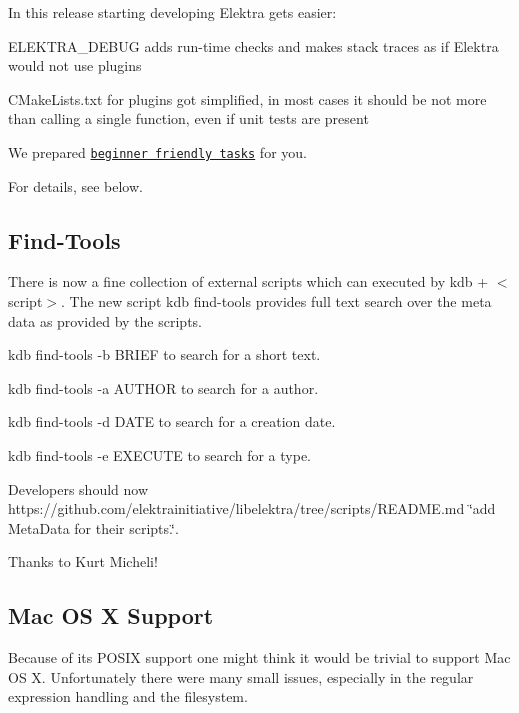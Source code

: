 In this release starting developing Elektra gets easier\+:


\begin{DoxyItemize}
\item E\+L\+E\+K\+T\+R\+A\+\_\+\+D\+E\+B\+U\+G adds run-\/time checks and makes stack traces as if Elektra would not use plugins
\item C\+Make\+Lists.\+txt for plugins got simplified, in most cases it should be not more than calling a single function, even if unit tests are present
\item We prepared \href{https://github.com/ElektraInitiative/libelektra/issues?q=is%3Aissue+is%3Aopen+label%3A%22beginner+friendly%22}{\tt beginner friendly tasks} for you.
\end{DoxyItemize}

For details, see below.

\subsection*{Find-\/\+Tools}

There is now a fine collection of external scripts which can executed by {\ttfamily kdb + $<$script$>$}. The new script {\ttfamily kdb find-\/tools} provides full text search over the meta data as provided by the scripts.


\begin{DoxyItemize}
\item {\ttfamily kdb find-\/tools -\/b B\+R\+I\+E\+F} to search for a short text.
\item {\ttfamily kdb find-\/tools -\/a A\+U\+T\+H\+O\+R} to search for a author.
\item {\ttfamily kdb find-\/tools -\/d D\+A\+T\+E} to search for a creation date.
\item {\ttfamily kdb find-\/tools -\/e E\+X\+E\+C\+U\+T\+E} to search for a type.
\end{DoxyItemize}

Developers should now https\+://github.com/elektrainitiative/libelektra/tree/scripts/\+R\+E\+A\+D\+M\+E.\+md \char`\"{}add Meta\+Data for their scripts.\char`\"{}.

Thanks to Kurt Micheli!

\subsection*{Mac O\+S X Support}

Because of its P\+O\+S\+I\+X support one might think it would be trivial to support Mac O\+S X. Unfortunately there were many small issues, especially in the regular expression handling and the filesystem.

